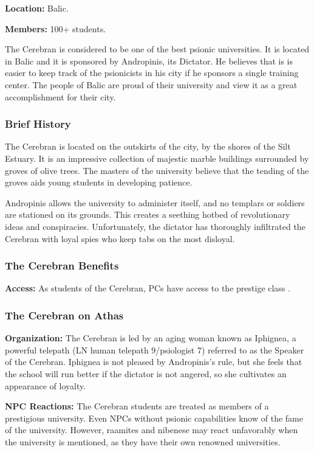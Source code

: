 \textbf{Location:} Balic.

\textbf{Members:} 100+ students.

The Cerebran is considered to be one of the best psionic universities. It is located in Balic and it is sponsored by Andropinis, its Dictator. He believes that is is easier to keep track of the psionicists in his city if he sponsors a single training center. The people of Balic are proud of their university and view it as a great accomplishment for their city.

\subsubsection{Brief History}
The Cerebran is located on the outskirts of the city, by the shores of the Silt Estuary. It is an impressive collection of majestic marble buildings surrounded by groves of olive trees. The masters of the university believe that the tending of the groves aids young students in developing patience.

Andropinis allows the university to administer itself, and no templars or soldiers are stationed on its grounds. This creates a seething hotbed of revolutionary ideas and conspiracies. Unfortunately, the dictator has thoroughly infiltrated the Cerebran with loyal spies who keep tabs on the most disloyal.

\subsubsection{The Cerebran Benefits}
\textbf{Access:} As students of the Cerebran, PCs have access to the prestige class .

\subsubsection{The Cerebran on Athas}
\textbf{Organization:} The Cerebran is led by an aging woman known as Iphignea, a powerful telepath (LN human telepath 9/psiologist 7) referred to as the Speaker of the Cerebran. Iphignea is not pleased by Andropinis's rule, but she feels that the school will run better if the dictator is not angered, so she cultivates an appearance of loyalty.

\textbf{NPC Reactions:} The Cerebran students are treated as members of a prestigious university. Even NPCs without psionic capabilities know of the fame of the university. However, raamites and nibenese may react unfavorably when the university is mentioned, as they have their own renowned universities.

